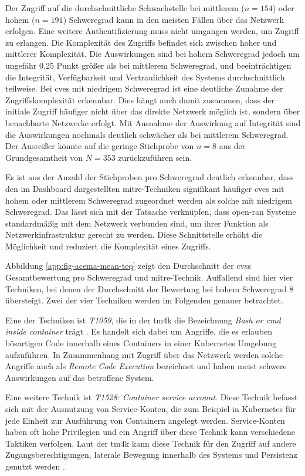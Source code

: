 \par Der Zugriff auf die durchschnittliche Schwachstelle bei mittlerem (\(n = 154\)) oder hohem (\(n = 191\)) Schweregrad kann in den meisten Fällen über das Netzwerk erfolgen. Eine weitere Authentifizierung muss nicht umgangen werden, um Zugriff zu erlangen. Die Komplexität des Zugriffs befindet sich zwischen hoher und mittlerer Komplexität. Die Auswirkungen sind bei hohem Schweregrad jedoch um ungefähr 0,25 Punkt größer als bei mittlerem Schweregrad, und beeinträchtigen die Integrität, Verfügbarkeit und Vertraulichkeit des Systems durchschnittlich teilweise. Bei \glspl{cve} mit niedrigem Schweregrad ist eine deutliche Zunahme der Zugriffskomplexität erkennbar. Dies hängt auch damit zusammen, dass der initiale Zugriff häufiger nicht über das direkte Netzwerk möglich ist, sondern über benachbarte Netzwerke erfolgt. Mit Ausnahme der Auswirkung auf Integrität sind die Auswirkungen nochmals deutlich schwächer als bei mittlerem Schweregrad. Der Ausreißer könnte auf die geringe Stichprobe von \(n = 8\) aus der Grundgesamtheit von \(N = 353\) zurückzuführen sein.
\par Es ist aus der Anzahl der Stichproben pro Schweregrad deutlich erkennbar, dass den im Dashboard dargestellten \gls{mitre}-Techniken signifikant häufiger \glspl{cve} mit hohem oder mittlerem Schweregrad zugeordnet werden als solche mit niedrigem Schweregrad. Das lässt sich mit der Tatsache verknüpfen, dass \gls{open-ran} Systeme standardmäßig mit dem Netzwerk verbunden sind, um ihrer Funktion als Netzwerkinfrastruktur gerecht zu werden. Diese Schnittstelle erhöht die Möglichkeit und reduziert die Komplexität eines Zugriffs.
\par Abbildung \ref{app:fig-acema-mean-teq} zeigt den Durchschnitt der \gls{cvss} Gesamtbewertung pro Schweregrad und \gls{mitre}-Technik. Auffallend sind hier vier Techniken, bei denen der Durchschnitt der Bewertung bei hohem Schweregrad 8 übersteigt. Zwei der vier Techniken werden im Folgenden genauer betrachtet.
\par Eine der Techniken ist \textit{T1059}, die in der \gls{tm4k} die Bezeichnung \textit{Bash or cmd inside container} trägt \autocite{BashCmdContainer}. Es handelt sich dabei um Angriffe, die es erlauben bösartigen Code innerhalb eines Containers in einer Kubernetes Umgebung aufzuführen. In Zusammenhang mit Zugriff über das Netzwerk werden solche Angriffe auch als \textit{Remote Code Execution} bezeichnet und haben meist schwere Auswirkungen auf das betroffene System.
\par Eine weitere Technik ist \textit{T1528: Container service account}. Diese Technik befasst sich mit der Ausnutzung von Service-Konten, die zum Beispiel in Kubernetes für jede Einheit zur Ausführung von Containern angelegt werden. Service-Konten haben oft hohe Privilegien und ein Angriff über diese Technik kann verschiedene Taktiken verfolgen. Laut der \gls{tm4k} kann diese Technik für den Zugriff auf andere Zugangsberechtigungen, laterale Bewegung innerhalb des Systems und Persistenz genutzt werden \autocite{ContainerServiceAccount}.
